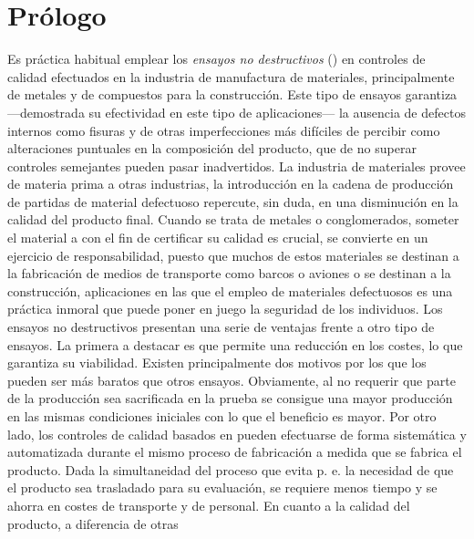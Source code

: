 \chapter{Prólogo}

%

Es práctica habitual emplear los \emph{ensayos no destructivos}
() en controles de calidad efectuados en la industria de
manufactura de materiales, principalmente de metales y de compuestos para
la construcción. Este tipo de ensayos garantiza ---demostrada su
efectividad en este tipo de aplicaciones--- la ausencia de defectos
internos como fisuras y de otras imperfecciones más difíciles de percibir
como alteraciones puntuales en la composición del producto, que de no
superar controles semejantes pueden pasar inadvertidos. La industria de
materiales provee de materia prima a otras industrias, la introducción en
la cadena de producción de partidas de material defectuoso repercute, sin
duda, en una disminución en la calidad del producto final. Cuando se trata
de metales o conglomerados, someter el material a  con el fin de
certificar su calidad es crucial, se convierte en un ejercicio de
responsabilidad, puesto que muchos de estos materiales se destinan a la
fabricación de medios de transporte como barcos o aviones o se destinan a
la construcción, aplicaciones en las que el empleo de materiales
defectuosos es una práctica inmoral que puede poner en juego la seguridad
de los individuos. Los ensayos no destructivos presentan una serie de
ventajas frente a otro tipo de ensayos. La primera a destacar es que
permite una reducción en los costes, lo que garantiza su viabilidad.
Existen principalmente dos motivos por los que los  pueden ser más
baratos que otros ensayos. Obviamente, al no requerir que parte de la
producción sea sacrificada en la prueba se consigue una mayor producción en
las mismas condiciones iniciales con lo que el beneficio es mayor. Por otro
lado, los controles de calidad basados en  pueden efectuarse de
forma sistemática y automatizada durante el mismo proceso de fabricación a
medida que se fabrica el producto. Dada la simultaneidad del proceso que
evita p. e. la necesidad de que el producto sea trasladado para su
evaluación, se requiere menos tiempo y se ahorra en costes de transporte y
de personal. En cuanto a la calidad del producto, a diferencia de otras
